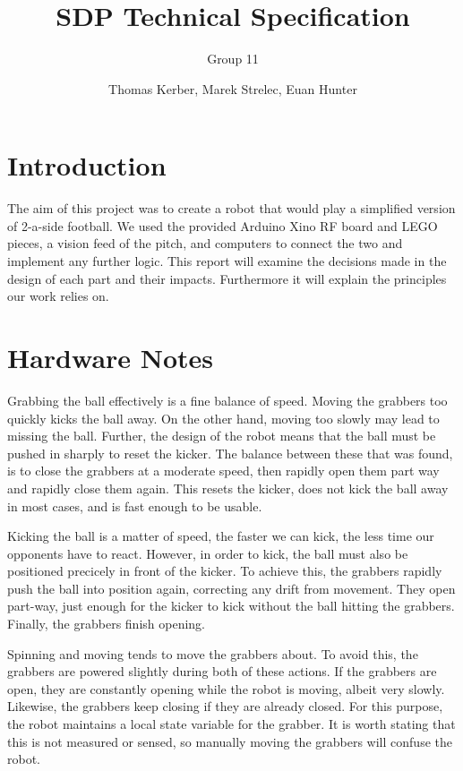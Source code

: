 \documentclass[a4paper,12pt]{scrartcl}
\author{Thomas Kerber, Marek Strelec, Euan Hunter}
\title{SDP Technical Specification}
\subtitle{Group 11}
\begin{document}
\maketitle

\section{Introduction}

The aim of this project was to create a robot that would play a simplified
version of 2-a-side football. We used the provided Arduino Xino RF board and
LEGO pieces, a vision feed of the pitch, and computers to connect the two and
implement any further logic. This report will examine the decisions made in the
design of each part and their impacts. Furthermore it will explain the
principles our work relies on.





\section{Hardware Notes}

Grabbing the ball effectively is a fine balance of speed. Moving the grabbers
too quickly kicks the ball away. On the other hand, moving too slowly may lead
to missing the ball. Further, the design of the robot means that the ball must
be pushed in sharply to reset the kicker. The balance between these that was
found, is to close the grabbers at a moderate speed, then rapidly open them
part way and rapidly close them again. This resets the kicker, does not kick the ball away in most cases, and is fast enough to be usable.

Kicking the ball is a matter of speed, the faster we can kick, the less time
our opponents have to react. However, in order to kick, the ball must also be
positioned precicely in front of the kicker. To achieve this, the grabbers
rapidly push the ball into position again, correcting any drift from movement.
They open part-way, just enough for the kicker to kick without the ball
hitting the grabbers. Finally, the grabbers finish opening.

Spinning and moving tends to move the grabbers about. To avoid this, the
grabbers are powered slightly during both of these actions. If the grabbers are
open, they are constantly opening while the robot is moving, albeit very
slowly. Likewise, the grabbers keep closing if they are already closed. For
this purpose, the robot maintains a local state variable for the grabber. It is
worth stating that this is not measured or sensed, so manually moving the
grabbers will confuse the robot.




\pagebreak
\appendix




\end{document}
